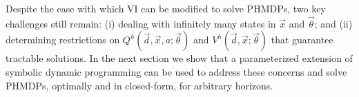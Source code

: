 Despite the ease with which VI can be modified to solve PHMDPs, two key challenges still remain: (i) dealing with infinitely many states in {\footnotesize $\vec{x}$} and {\footnotesize $\vec{\theta}$}; and (ii) determining restrictions on {\footnotesize $Q^{h}(\vec{d}, \vec{x}, a; \vec{\theta})$} and {\footnotesize $V^{h}(\vec{d}, \vec{x}; \vec{\theta})$} that guarantee tractable solutions. In the next section we show that a parameterized extension of symbolic dynamic programming can be used to address these concerns and solve PHMDPs, optimally and in closed-form, for arbitrary horizons.